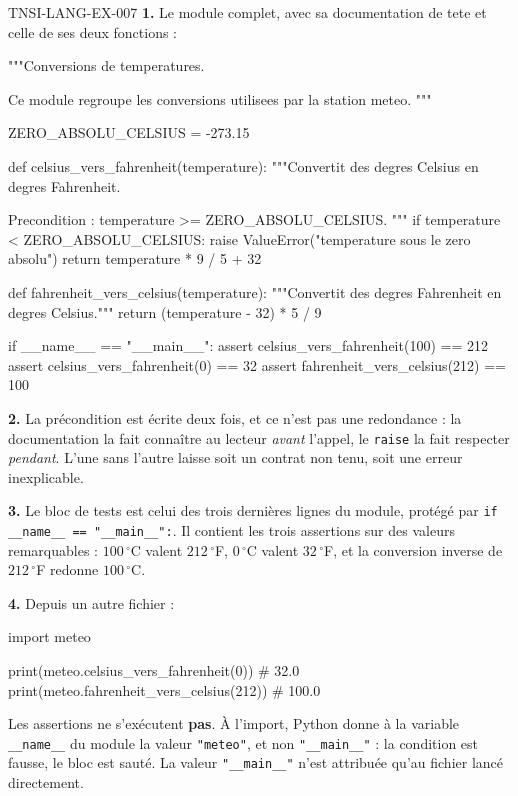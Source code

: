 \begin{corrige}{TNSI-LANG-EX-007}
\textbf{1.} Le module complet, avec sa documentation de tete et celle de ses
deux fonctions :
\begin{python}
"""Conversions de temperatures.

Ce module regroupe les conversions utilisees par la station meteo.
"""

ZERO_ABSOLU_CELSIUS = -273.15


def celsius_vers_fahrenheit(temperature):
    """Convertit des degres Celsius en degres Fahrenheit.

    Precondition : temperature >= ZERO_ABSOLU_CELSIUS.
    """
    if temperature < ZERO_ABSOLU_CELSIUS:
        raise ValueError("temperature sous le zero absolu")
    return temperature * 9 / 5 + 32


def fahrenheit_vers_celsius(temperature):
    """Convertit des degres Fahrenheit en degres Celsius."""
    return (temperature - 32) * 5 / 9


if __name__ == "__main__":
    assert celsius_vers_fahrenheit(100) == 212
    assert celsius_vers_fahrenheit(0) == 32
    assert fahrenheit_vers_celsius(212) == 100
\end{python}
\textbf{2.} La précondition est écrite deux fois, et ce n'est pas une
redondance : la documentation la fait connaître au lecteur \emph{avant} l'appel,
le \lstinline{raise} la fait respecter \emph{pendant}. L'une sans l'autre laisse
soit un contrat non tenu, soit une erreur inexplicable.

\textbf{3.} Le bloc de tests est celui des trois dernières lignes du module,
protégé par \lstinline{if __name__ == "__main__":}. Il contient les trois
assertions sur des valeurs remarquables : $100\,^\circ$C valent
$212\,^\circ$F, $0\,^\circ$C valent $32\,^\circ$F, et la conversion inverse
de $212\,^\circ$F redonne $100\,^\circ$C.

\textbf{4.} Depuis un autre fichier :
\begin{python}
import meteo

print(meteo.celsius_vers_fahrenheit(0))    # 32.0
print(meteo.fahrenheit_vers_celsius(212))  # 100.0
\end{python}
Les assertions ne s'exécutent \textbf{pas}. À l'import, Python donne à la
variable \lstinline{__name__} du module la valeur \lstinline{"meteo"}, et non
\lstinline{"__main__"} : la condition est fausse, le bloc est sauté. La valeur
\lstinline{"__main__"} n'est attribuée qu'au fichier lancé directement.


\end{corrige}
